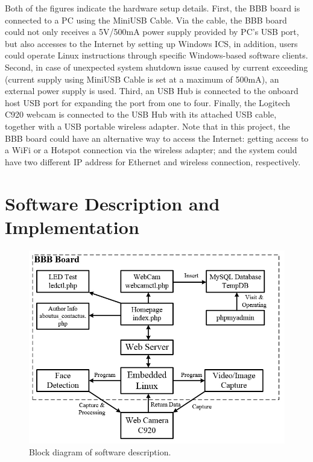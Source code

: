 \documentclass[12pt,journal,draftclsnofoot,onecolumn]{IEEEtran}
\begin{document}
Both of the figures indicate the hardware setup details. First, the BBB board is connected to a PC using the MiniUSB Cable. Via the cable, the BBB board could not only receives a 5V/500mA power supply provided by PC's USB port, but also accesses to the Internet by setting up Windows ICS, in addition, users could operate Linux instructions through specific Windows-based software clients. Second, in case of unexpected system shutdown issue caused by current exceeding (current supply using MiniUSB Cable is set at a maximum of 500mA), an external power supply is used. Third, an USB Hub is connected to the onboard host USB port for expanding the port from one to four. Finally, the Logitech C920 webcam is connected to the USB Hub with its attached USB cable, together with a USB portable wireless adapter. Note that in this project, the BBB board could have an alternative way to access the Internet: getting access to a WiFi or a Hotspot connection via the wireless adapter; and the system could have two different IP address for Ethernet and wireless connection, respectively.


\section{Software Description and Implementation}\label{SfDes}
\begin{figure}[ht]
	\centering
	\includegraphics[width=6in]{./figs/sw1.jpg}
	\caption{Block diagram of software description.}
	\label{sw1}
\end{figure}
\end{document}
